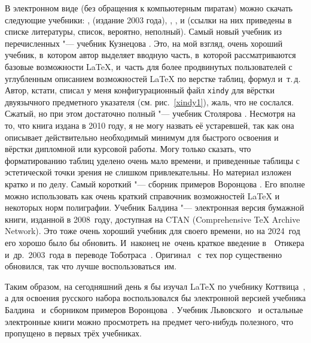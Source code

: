 \documentclass[a4paper,12pt,hyphens]{article}
\newcommand\exe[1]{\texttt{#1}}
\begin{document}
В электронном виде (без обращения к компьютерным пиратам) можно скачать следующие учебники: \parencite{oetiker-et-al:2003}, \parencite{lvovskiy:2014} (издание 2003 года), \parencite{vorontsov:2005}, \parencite{baldin:2008}, \parencite{stolyarov:2010} и \parencite{kuznetsov:2021} (ссылки на них приведены в списке литературы, список, вероятно, неполный). Самый новый учебник из перечисленных "--- учебник Кузнецова \parencite{kuznetsov:2021}. Это, на мой взгляд, очень хороший учебник, в~котором автор выделяет вводную часть, в~которой рассматриваются базовые возможности \LaTeX, и~часть для более продвинутых пользователей с углубленным описанием возможностей \LaTeX{} по верстке таблиц, формул и~т.\,д. Автор, кстати, списал у меня конфигурационный файл \exe{xindy} для вёрстки двуязычного предметного указателя (см. рис.~\ref{xindy1}), жаль, что не сослался. Сжатый, но при этом достаточно полный "--- учебник Столярова \parencite{stolyarov:2010}. Несмотря на то, что книга издана в 2010 году, я не могу назвать её устаревшей, так как она описывает действительно необходимый минимум для быстрого освоения и вёрстки дипломной или курсовой работы. Могу только сказать, что форматированию таблиц уделено очень мало времени, и приведенные таблицы с эстетической точки зрения не слишком привлекательны. Но материал изложен кратко и по делу. Самый короткий "--- сборник примеров Воронцова \parencite{vorontsov:2005}. Его вполне можно использовать как очень краткий справочник возможностей \LaTeX{} и некоторых норм полиграфии. Учебник Балдина \parencite{baldin:2008} "--- электронная версия бумажной книги, изданной в 2008~году, доступная на CTAN (Comprehensive \TeX{} Archive Network). Это тоже очень хороший учебник для своего времени, но на 2024~год его хорошо было бы обновить. И~наконец не~очень краткое введение в~\LaTeXe\ Отикера и~др.\ 2003~года в~переводе Тоботраса~\parencite{oetiker-et-al:2003}. Оригинал~\parencite{oetiker-et-al:2021} с~тех пор существенно обновился, так что лучше воспользоваться~им.

Таким образом, на сегодняшний день я бы изучал \LaTeX{} по учебнику Коттвица~\parencite{kottwitz:2022}, а для освоения русского набора воспользовался бы электронной версией учебника Балдина~\parencite{baldin:2008} и~сборником примеров Воронцова~\parencite{vorontsov:2005}. Учебник Львовского~\parencite{lvovskiy:2014} и остальные электронные книги можно просмотреть на предмет чего-нибудь полезного, что пропущено в первых трёх учебниках.
\end{document}
